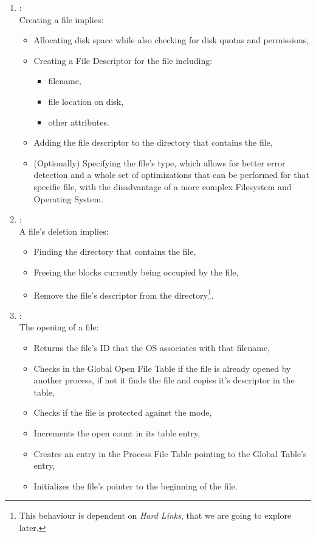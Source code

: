 \documentclass[openright, twoside]{report}
\theoremstyle{definition}
\theoremstyle{example}
\begin{document}
\begin{enumerate}

	\item {}:\\
	Creating a file implies:
	\begin{itemize}
		\item Allocating disk space while also checking for disk quotas and permissions,
		\item Creating a File Descriptor for the file including: 
		\begin{itemize}
			\item filename,
			\item file location on disk,
			\item other attributes.
		\end{itemize}
		\item Adding the file descriptor to the directory that contains the file,
		\item (Optionally) Specifying the file's type, which allows for better error detection and a whole 
		set of optimizations that can be performed for that specific file, with the disadvantage
		of a more complex Filesystem and Operating System.
	\end{itemize}
	
	\item {}:\\
	A file's deletion implies:
	\begin{itemize}
		\item Finding the directory that contains the file,
		\item Freeing the blocks currently being occupied by the file,
		\item Remove the file's descriptor from the directory\footnote{This behaviour is dependent 
		on \emph{Hard Links}, that we are going to explore later.}.
	\end{itemize}

	\item {}:\\
	The opening of a file:
	\begin{itemize}
		\item Returns the file's ID that the OS associates with that filename,
		\item Checks in the Global Open File Table if the file is already opened by 
		another process, if not it finds the file and copies it's descriptor in the table,
		\item Checks if the file is protected against the mode,
		\item Increments the open count in its table entry,
		\item Creates an entry in the Process File Table pointing to the Global Table's entry, 
		\item Initializes the file's pointer to the beginning of the file.


\end{itemize}
\end{enumerate}
\end{document}
